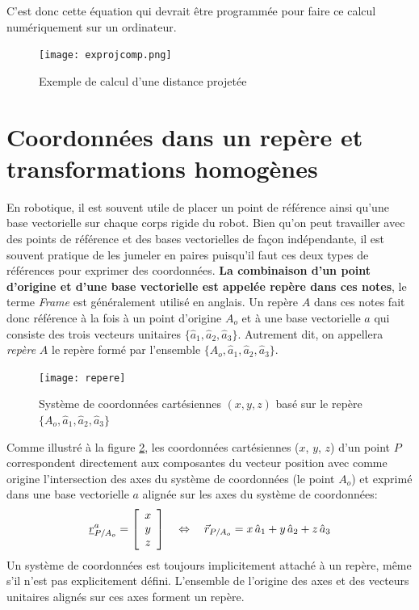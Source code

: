 C'est donc cette équation qui devrait être programmée pour faire ce calcul numériquement sur un ordinateur.
\begin{figure}[htbp]
	\centering
	\texttt{[image: exprojcomp.png]}
	\caption{Exemple de calcul d'une distance projetée}
	\label{fig:exprojcomp}
\end{figure}


\newpage
\section{Coordonnées dans un repère et transformations homogènes}
\label{sec:repere}

En robotique, il est souvent utile de placer un point de référence ainsi qu'une base vectorielle sur chaque corps rigide du robot. Bien qu'on peut travailler avec des points de référence et des bases vectorielles de façon indépendante, il est souvent pratique de les jumeler en paires puisqu'il faut ces deux types de références pour exprimer des coordonnées. \textbf{La combinaison d'un point d'origine et d'une base vectorielle est appelée repère dans ces notes}, le terme \textit{Frame} est généralement utilisé en anglais. Un repère $A$ dans ces notes fait donc référence à la fois à un point d'origine $A_o$ et à une base vectorielle $a$ qui consiste des trois vecteurs unitaires $\{ \hat{a}_1, \hat{a}_2, \hat{a}_3 \}$. Autrement dit, on appellera \textit{repère} $A$ le repère formé par l'ensemble $\{ A_o, \hat{a}_1, \hat{a}_2, \hat{a}_3 \}$.
\begin{figure}[htpb]
	\centering
	\texttt{[image: repere]}
	\caption{Système de coordonnées cartésiennes $(x,y,z)$ basé sur le repère $\{A_o,\hat{a}_1,\hat{a}_2,\hat{a}_3\}$}
	\label{fig:repere}
\end{figure}

Comme illustré à la figure \ref{fig:repere}, les coordonnées cartésiennes ($x$, $y$, $z$) d'un point $P$ correspondent directement aux composantes du vecteur position avec comme origine l'intersection des axes du système de coordonnées (le point $A_o$) et exprimé dans une base vectorielle $a$ alignée sur les axes du système de coordonnées:
\begin{align}
	\underline{r}_{P/A_o}^a = \left[ \begin{array}{c}
								   x \\ y \\ z
	\end{array} \right]   \quad \Leftrightarrow \quad
	\vec{r}_{P/A_o} = x \, \hat{a}_{1} + y \, \hat{a}_{2} + z \, \hat{a}_{3}
\end{align}
Un système de coordonnées est toujours implicitement attaché à un repère, même s'il n'est pas explicitement défini. L'ensemble de l'origine des axes et des vecteurs unitaires alignés sur ces axes forment un repère.

